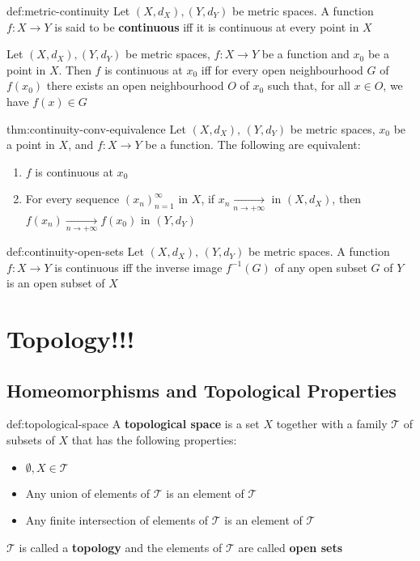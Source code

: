\documentclass[landscape, 8pt]{extarticle}
\begin{document}
\begin{multicols}{3}
\begin{dfn}{def:metric-continuity}{}
    Let $(X, d_{X}), (Y, d_{Y})$ be metric spaces. A function $f: X \to Y $ is said to be \textbf{continuous} iff it is continuous at every point in $X$
\end{dfn}

\begin{thm}[]{}{}
    Let $(X,d_{X}), (Y, d_{Y})$ be metric spaces, $f : X \to Y$ be a function and $x_{0}$ be a point in $X$. Then $f$ is continuous at $x_{0}$ iff for every open neighbourhood $G$ of $f(x_{0})$ there exists an open neighbourhood $O$ of $x_{0}$ such that, for all $x\in O$, we have $f(x) \in G$
\end{thm}

\begin{thm}{thm:continuity-conv-equivalence}{}
    Let $(X, d_{X}),\, (Y, d_{Y})$ be metric spaces, $x_{0}$ be a point in $X$, and $f : X \to Y$ be a function. The following are equivalent:
    \begin{enumerate}
        \item $f$ is continuous at $x_{0}$
        \item For every sequence $(x_{n})^{\infty}_{n = 1}$ in $X$, if $x_{n}\xrightarrow[n\to +\infty]{}$ in $(X, d_{X})$, then $f(x_{n}) \xrightarrow[n\to +\infty]{} f(x_{0})$ in $(Y, d_{Y})$
    \end{enumerate}
\end{thm}

\begin{thm}{def:continuity-open-sets}{}
    Let $(X, d_{X}),\,(Y, d_{Y})$ be metric spaces. A function $f: X \to Y $ is continuous iff the inverse image $f^{-1}(G)$ of any open subset $G$ of $Y$ is an open subset of $X$
\end{thm}

\section{Topology!!!}
\subsection{Homeomorphisms and Topological Properties}
\begin{dfn}{def:topological-space}{}
    A \textbf{topological space} is a set $X$ together with a family $\mathcal{T}$ of subsets of $X$ that has the following properties:
    \begin{itemize}
        \item $\emptyset,X\in \mathcal{T}$
        \item Any union of elements of $\mathcal{T}$ is an element of $\mathcal{T}$
        \item Any finite intersection of elements of $\mathcal{T}$ is an element of $\mathcal{T}$
    \end{itemize}
    $\mathcal{T}$ is called a \textbf{topology} and the elements of $\mathcal{T}$ are called \textbf{open sets}
\end{dfn}


\end{multicols}
\end{document}
